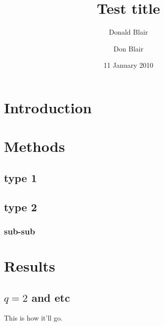 \documentclass[pre,preprint,11pt]{revtex4}
\author{Donald Blair}
\title{Test title}
\author{Don Blair}
\date{11 January 2010}
\begin{document}
\maketitle

\section{Introduction}
\label{sec-1}

\section{Methods}
\label{sec-2}

\subsection{type 1}
\label{sec-2.1}

\subsection{type 2}
\label{sec-2.2}

\subsubsection{sub-sub}
\label{sec-2.2.1}

\section{Results}
\label{sec-3}

\subsection{$q=2$ and etc}
\label{sec-3.1}

This is how it'll go.



\end{document}
